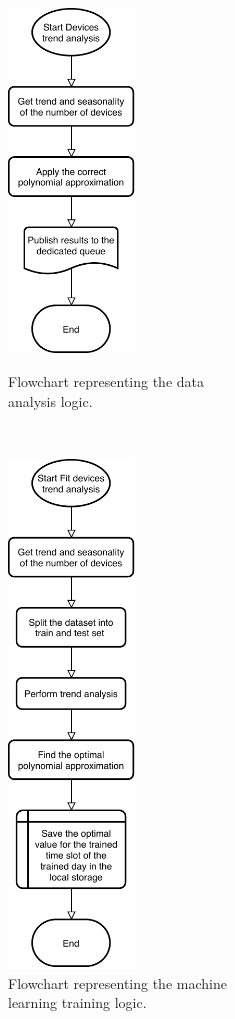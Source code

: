 \begin{figure}
\begin{minipage}[b]{8.5cm}
\centering
\includegraphics[width=0.3\textwidth]{images/flowML}
\caption{Flowchart representing the data\\analysis logic.}
\label{fig:flowML}
\end{minipage}
\ \hspace{2mm} \
\begin{minipage}[b]{8.5cm}
\centering
\includegraphics[width=0.3\textwidth]{images/flowtrainML}
\caption{Flowchart representing the machine\\learning training logic.}
\label{fig:flowtrainML}
\end{minipage}
\end{figure}

